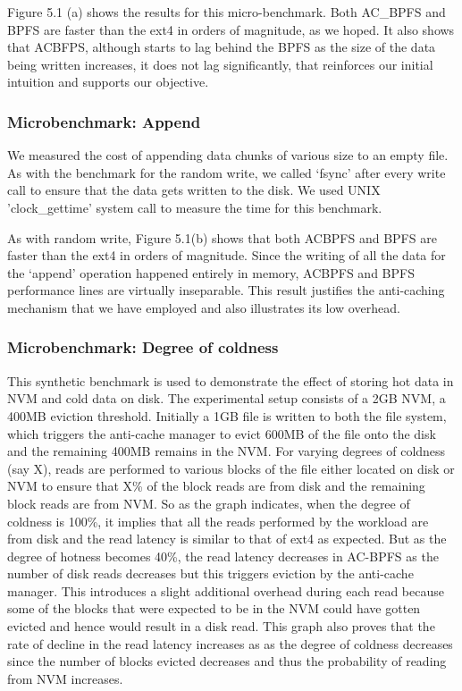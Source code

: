 Figure 5.1 (a) shows the results for this micro-benchmark. Both AC\_BPFS and BPFS are faster than the ext4 in orders of magnitude, as we hoped. It also shows that AC\-BFPS, although starts to lag behind the BPFS as the size of the data being written increases, it does not lag significantly, that reinforces our initial intuition and supports our objective.



\subsubsection{Microbenchmark: Append}
We measured the cost of appending data chunks of various size to an empty file. As with the benchmark for the random write, we called ‘fsync’ after every write call to ensure that the data gets written to the disk. We used UNIX 'clock\_gettime' system call to measure the time for this benchmark.

As with random write, Figure 5.1(b) shows that both AC\-BPFS and BPFS are faster than the ext4 in orders of magnitude. Since the writing of all the data for the ‘append’ operation happened entirely in memory, AC\-BPFS and BPFS performance lines are virtually inseparable. This result justifies the anti-caching mechanism that we have employed and also illustrates its low overhead.


\subsubsection{Microbenchmark: Degree of coldness}
This synthetic benchmark is used to demonstrate the effect of storing hot data in NVM and cold data on disk. The experimental setup consists of a 2GB NVM, a 400MB eviction threshold. Initially a 1GB file is written to both the file system, which triggers the anti-cache manager to evict 600MB of the file onto the disk and the remaining 400MB remains in the NVM. For varying degrees of coldness (say X), reads are performed to various blocks of the file either located on disk or NVM to ensure that X\% of the block reads are from disk and the remaining block reads are from NVM. So as the graph indicates, when the degree of coldness is 100\%, it implies that all the reads performed by the workload are from disk and the read latency is similar to that of ext4 as expected. But as the degree of hotness becomes 40\%, the read latency decreases in AC-BPFS as the number of disk reads decreases but this triggers eviction by the anti-cache manager. This introduces a slight additional overhead during each read because some of the blocks that were expected to be in the NVM could have gotten evicted and hence would result in a disk read. This graph also proves that the rate of decline in the read latency increases as as the degree of coldness decreases since the number of blocks evicted decreases and thus the probability of reading from NVM increases.


